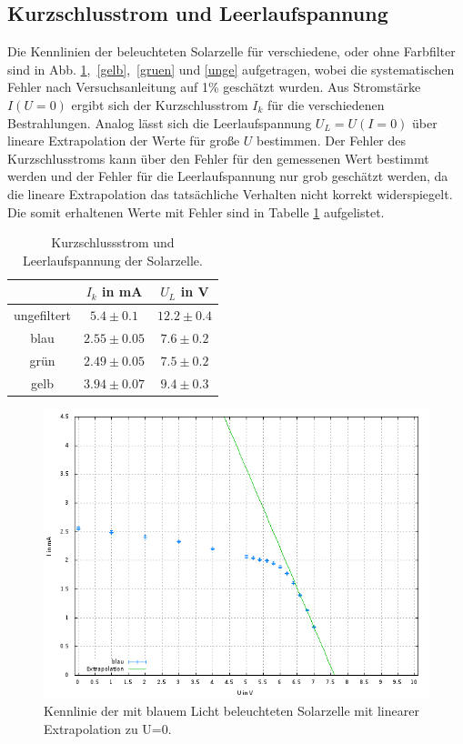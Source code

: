 \subsection*{Kurzschlusstrom und Leerlaufspannung}
Die Kennlinien der beleuchteten Solarzelle für verschiedene, oder ohne Farbfilter sind in Abb. \ref{blau},\ \ref{gelb},\ \ref{gruen} und \ref{unge} aufgetragen, wobei die systematischen Fehler nach Versuchsanleitung auf 1\% geschätzt wurden. Aus Stromstärke $I(U=0)$ ergibt sich der Kurzschlusstrom $I_{k}$ für die verschiedenen Bestrahlungen. Analog lässt sich die Leerlaufspannung $U_{L}=U(I=0)$ über lineare Extrapolation der Werte für große $U$ bestimmen. Der Fehler des Kurzschlusstroms kann über den Fehler für den gemessenen Wert bestimmt werden und der Fehler für die Leerlaufspannung nur grob geschätzt werden, da die lineare Extrapolation das tatsächliche Verhalten nicht korrekt widerspiegelt. Die somit erhaltenen Werte mit Fehler sind in Tabelle \ref{werte} aufgelistet.\\
\begin{table}
\begin{center}
\begin{tabular}{|c|c|c|}
&$I_{k}$ in mA&$U_{L}$ in V\\
\hline
ungefiltert&$5.4\pm 0.1$ &$12.2 \pm 0.4$ \\
\hline
blau&$2.55\pm 0.05$ &$7.6\pm 0.2$\\
\hline
grün&$2.49\pm 0.05$ & $7.5 \pm 0.2$\\
\hline 
gelb&$3.94\pm 0.07$ & $9.4\pm 0.3$\\
\hline
\end{tabular}
\caption{Kurzschlussstrom und Leerlaufspannung der Solarzelle.\label{werte}}
\end{center}
\end{table}
\begin{figure}
\includegraphics[scale=0.6]{Auswertung/blau.png}
\caption{Kennlinie der mit blauem Licht beleuchteten Solarzelle mit linearer Extrapolation zu U=0.\label{blau}}
\end{figure}
